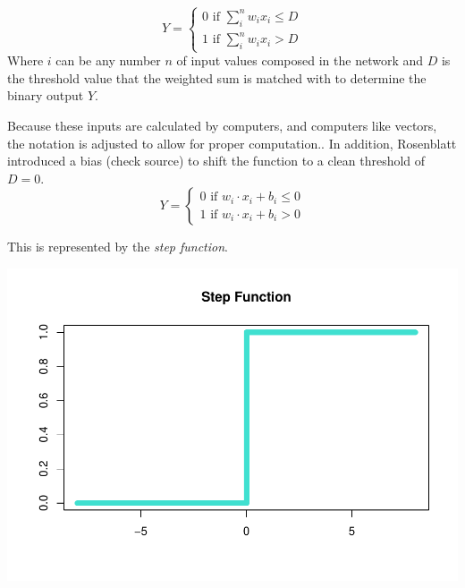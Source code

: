 \[
Y = 
\begin{cases}
0 \text{ if } \sum_i^n w_ix_i \le D \\
1 \text{ if } \sum_i^n w_ix_i > D
\end{cases}
\] Where \(i\) can be any number \(n\) of input values composed in the
network and \(D\) is the threshold value that the weighted sum is
matched with to determine the binary output \(Y\).

Because these inputs are calculated by computers, and computers like
vectors, the notation is adjusted to allow for proper computation.. In
addition, Rosenblatt introduced a bias (check source) to shift the
function to a clean threshold of \(D = 0\). \[
Y = 
\begin{cases}
0 \text{ if } w_i \cdot x_i + b_i \le 0 \\
1 \text{ if } w_i \cdot x_i + b_i > 0
\end{cases}
\]

This is represented by the \emph{step function}.

\begin{Shaded}
\begin{Highlighting}[]
\OtherTok{\textless{}{-}} 
  \SpecialCharTok{\textless{}=} \NormalTok{,}\NormalTok{,}\NormalTok{) }
\NormalTok{\}}

\OtherTok{\textless{}{-}} \NormalTok{(}\SpecialCharTok{{-}}\NormalTok{,}\NormalTok{, }\NormalTok{)}

 \NormalTok{, } \NormalTok{, }\NormalTok{, } \NormalTok{, } \NormalTok{, } \NormalTok{(}\NormalTok{,}\NormalTok{), } \NormalTok{, }
\end{Highlighting}
\end{Shaded}

\includegraphics{ANN_files/unnamed-chunk-1-1.pdf}

